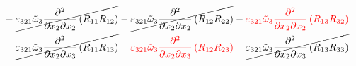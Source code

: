 \begin{equation}
\begin{split}
&		-\cancel{\varepsilon_{321}\tilde{\omega}_{3}\pdv{}{x_{2}}{x_{2}}\left(R_{11}R_{12}\right)}
		-\cancel{\varepsilon_{321}\tilde{\omega}_{3}\pdv{}{x_{2}}{x_{2}}\left(R_{12}R_{22}\right)}
		-{\color{red}\varepsilon_{321}\tilde{\omega}_{3}\pdv{}{x_{2}}{x_{2}}\left(R_{13}R_{32}\right)}\\
&		-\cancel{\varepsilon_{321}\tilde{\omega}_{3}\pdv{}{x_{2}}{x_{3}}\left(R_{11}R_{13}\right)}
		-{\color{red}\varepsilon_{321}\tilde{\omega}_{3}\pdv{}{x_{2}}{x_{3}}\left(R_{12}R_{23}\right)}
		-\cancel{\varepsilon_{321}\tilde{\omega}_{3}\pdv{}{x_{2}}{x_{3}}\left(R_{13}R_{33}\right)}\\
	\end{split}
\end{equation}
